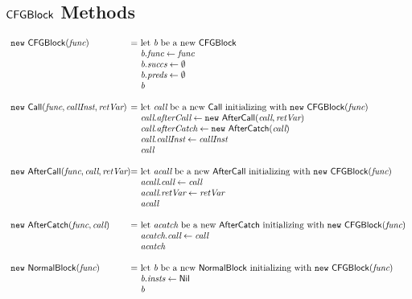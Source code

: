 \subsection{$\mbox{\textsf{CFGBlock}}$ Methods}
\[
\begin{array}{l@{}l@{~}l}
\new\ \CFGBlock(\emph{func})
& = & \text{let } \emph{b} \text{ be a new } \CFGBlock\\
& & \emph{b}.\emph{func} \leftarrow \emph{func}\\
& & \emph{b}.\emph{succs} \leftarrow \emptyset\\
& & \emph{b}.\emph{preds} \leftarrow \emptyset\\
& & \emph{b}\\
& & \\

\new\ \Call(\emph{func}, \emph{callInst}, \emph{retVar})
& = & \text{let } \emph{call} \text{ be a new } \Call \text{ initializing with } \new\ \CFGBlock(\emph{func})\\
& & \emph{call}.\emph{afterCall} \leftarrow \new\ \AfterCall(\emph{call}, \emph{retVar})\\
& & \emph{call}.\emph{afterCatch} \leftarrow \new\ \AfterCatch(\emph{call})\\
& & \emph{call}.\emph{callInst} \leftarrow \emph{callInst}\\
& & \emph{call}\\
& & \\

\new\ \AfterCall(\emph{func}, \emph{call}, \emph{retVar})
& = & \text{let } \emph{acall} \text{ be a new } \AfterCall \text{ initializing with } \new\ \CFGBlock(\emph{func})\\
& & \emph{acall}.\emph{call} \leftarrow \emph{call}\\
& & \emph{acall}.\emph{retVar} \leftarrow \emph{retVar}\\
& & \emph{acall}\\
& & \\

\new\ \AfterCatch(\emph{func}, \emph{call})
& = & \text{let } \emph{acatch} \text{ be a new } \AfterCatch \text{ initializing with } \new\ \CFGBlock(\emph{func})\\
& & \emph{acatch}.\emph{call} \leftarrow \emph{call}\\
& & \emph{acatch}\\
& & \\

\new\ \NormalBlock(\emph{func})
& = & \text{let } \emph{b} \text{ be a new } \NormalBlock \text{ initializing with } \new\ \CFGBlock(\emph{func})\\
& & \emph{b}.\emph{insts} \leftarrow \Nil \\
& & \emph{b}\\
& & \\


\end{array}\]
